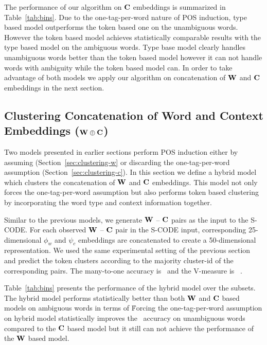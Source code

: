 The performance of our algorithm on ${\bf C}$ embeddings is summarized in
Table~\ref{tab:bins}.  Due to the one-tag-per-word nature of POS
induction, type based model outperforms the token based one on the
unambiguous words.  However the token based model achieves
statistically comparable results with the type based model on the
ambiguous words.  Type base model clearly handles unambiguous words
better than the token based model however it can not handle words with
ambiguity while the token based model can.  In order to take advantage
of both models we apply our algorithm on concatenation of ${\bf W}$ and ${\bf C}$
embeddings in the next section.

\subsection{Clustering Concatenation of Word and Context Embeddings (${\bf W}\oplus{\bf C}$)}
\label{sec:clustering-concatenation}

Two models presented in earlier sections perform POS induction either
by assuming (Section~\ref{sec:clustering-w} or discarding the
one-tag-per-word assumption (Section~\ref{sec:clustering-c}).  In this
section we define a hybrid model which clusters the concatenation of
${\bf W}$ and ${\bf C}$ embeddings.  This model not only forces the
one-tag-per-word assumption but also performs token based clustering
by incorporating the word type and context information together.

Similar to the previous models, we generate ${\bf W}$ -- ${\bf C}$
pairs as the input to the S-CODE.  For each observed ${\bf W}$ --
${\bf C}$ pair in the S-CODE input, corresponding 25-dimensional
$\phi_w$ and $\psi_c$ embeddings are concatenated to create a
50-dimensional representation.  We used the same experimental setting
of the previous section and predict the token clusters according to
the majority cluster-id of the corresponding pairs.  The many-to-one
accuracy is \wsxymto\ and the V-measure is \wsxyvm\ .

Table~\ref{tab:bins} presents the performance of the hybrid model over
the subsets.  The hybrid model performs statistically better than both
${\bf W}$ and ${\bf C}$ based models on ambiguous words in terms of
\mto\.  Forcing the one-tag-per-word assumption on hybrid model
statistically improves the \mto\ accuracy on unambiguous words
compared to the ${\bf C}$ based model but it still can not achieve the
performance of the ${\bf W}$ based model.



